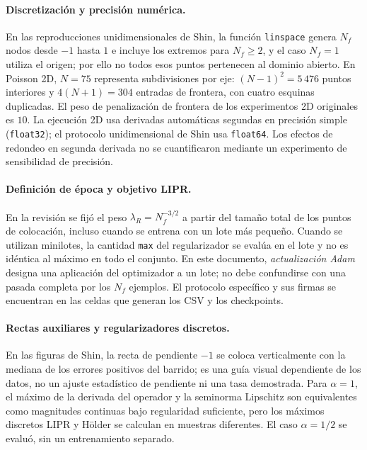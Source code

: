 \paragraph{Discretización y precisión numérica.}
En las reproducciones unidimensionales de Shin, la función \texttt{linspace} genera $N_f$ nodos desde $-1$ hasta $1$ e incluye los extremos para $N_f\geq2$, y el caso $N_f=1$ utiliza el origen; por ello no todos esos puntos pertenecen al dominio abierto. En Poisson 2D, $N=75$ representa subdivisiones por eje: $(N-1)^2=5\,476$ puntos interiores y $4(N+1)=304$ entradas de frontera, con cuatro esquinas duplicadas. El peso de penalización de frontera de los experimentos 2D originales es $10$. La ejecución 2D usa derivadas automáticas segundas en precisión simple (\texttt{float32}); el protocolo unidimensional de Shin usa \texttt{float64}. Los efectos de redondeo en segunda derivada no se cuantificaron mediante un experimento de sensibilidad de precisión.

\paragraph{Definición de época y objetivo LIPR.}
En la revisión se fijó el peso $\lambda_R=N_f^{-3/2}$ a partir del tamaño total de los puntos de colocación, incluso cuando se entrena con un lote más pequeño. Cuando se utilizan minilotes, la cantidad \texttt{max} del regularizador se evalúa en el lote y no es idéntica al máximo en todo el conjunto. En este documento, \emph{actualización Adam} designa una aplicación del optimizador a un lote; no debe confundirse con una pasada completa por los $N_f$ ejemplos. El protocolo específico y sus firmas se encuentran en las celdas que generan los CSV y los checkpoints.

\paragraph{Rectas auxiliares y regularizadores discretos.}
En las figuras de Shin, la recta de pendiente $-1$ se coloca verticalmente con la mediana de los errores positivos del barrido; es una guía visual dependiente de los datos, no un ajuste estadístico de pendiente ni una tasa demostrada. Para $\alpha=1$, el máximo de la derivada del operador y la seminorma Lipschitz son equivalentes como magnitudes continuas bajo regularidad suficiente, pero los máximos discretos LIPR y H\"older se calculan en muestras diferentes. El caso $\alpha=1/2$ se evaluó, sin un entrenamiento separado.

